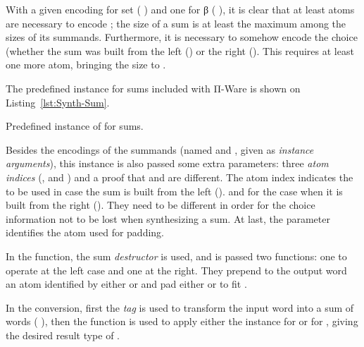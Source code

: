             With a given encoding for set  ( \AY{:}   \AY{\{}\AY{\}})
            and one for β ( \AY{:}   \AY{\{}\AY{\}}),
            it is clear that at least    atoms are necessary to encode   ;
            the size of a sum is at least the maximum among the sizes of its summands.
            Furthermore, it is necessary to somehow encode the choice (whether the sum was built from
            the left () or the right (). This requires at least one more atom,
            bringing the size to  \AY{(}  \AY{)}.

            The predefined instance for sums included with Π-Ware is shown on Listing~\ref{lst:Synth-Sum}.

            \begin{listing}[h]
                \caption{Predefined instance of  for sums.\label{lst:Synth-Sum}}
            \end{listing}

            Besides the encodings of the summands (named  and ,
            given as \emph{instance arguments}), this instance is also passed some extra parameters:
            three \emph{atom indices} (,  and ) and a proof that  and  are different.
            The atom index  indicates the  to be used in case the sum is built from the left ().
            and  for the case when it is built from the right ().
            They need to be different in order for the choice information not to be lost when synthesizing a sum.
            At last, the  parameter identifies the atom used for padding.

            In the  function, the \AF{[\_,\_]} sum \emph{destructor} is used,
            and is passed two functions: one to operate at the left case and one at the right.
            They prepend to the output word an atom identified by either  or  and pad
            either  or  to fit   .

            In the  conversion, first the \emph{tag} is used to transform the input word into
            a sum of words (    ),
            then the  function is used to apply either the  instance for  or for ,
            giving the desired result type of   .

